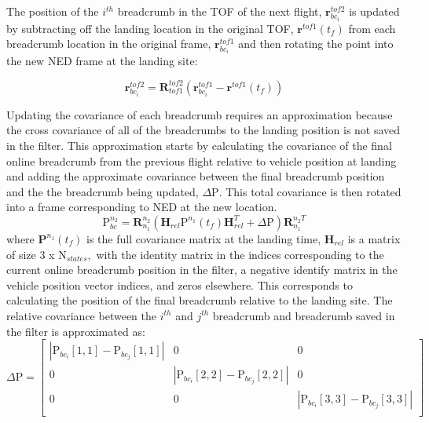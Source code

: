 The position of the $i^{th}$ breadcrumb in the TOF of the next flight, $\bm{r}_{bc_i}^{tof2}$ is updated by subtracting off the landing location in the original TOF, $\bm{r}^{tof1}(t_f)$ from each breadcrumb location in the original frame, $\bm{r}_{bc_i}^{tof1}$ and then rotating the point into the new NED frame at the landing site:

\begin{equation}
    \bm{r}_{bc_i}^{tof2} = \bm{R}_{tof1}^{tof2} \left( \bm{r}_{bc_i}^{tof1} - \bm{r}^{tof1}(t_f) \right)
\end{equation}

Updating the covariance of each breadcrumb requires an approximation because the cross covariance of all of the breadcrumbs to the landing position is not saved in the filter.  This approximation starts by calculating the covariance of the final online breadcrumb from the previous flight relative to vehicle position at landing and adding the approximate covariance between the final breadcrumb position and the the breadcrumb being updated, $\Delta \text{P}$.  This total covariance is then rotated into a frame corresponding to NED at the new location.  
\begin{equation}
    \text{P}_{bc}^{n_2} = \bm{R}_{n_1}^{n_2}\left(\bm{H}_{rel} \text{P}^{n_1}(t_f) \bm{H}_{rel}^T + \Delta \text{P}\right) \bm{R}_{n_1}^{n_2 T}
\end{equation}
\noindent where $\bm{P}^{n_1}(t_f)$ is the full covariance matrix at the landing time, $\bm{H}_{rel}$ is a matrix of size 3 x $\text{N}_{states},$ with the identity matrix in the indices corresponding to the current online breadcrumb position in the filter, a negative identify matrix in the vehicle position vector indices, and zeros elsewhere.  This corresponds to calculating the position of the final breadcrumb relative to the landing site.  The relative covariance between the $i^{th}$ and $j^{th}$ breadcrumb and breadcrumb saved in the filter is approximated as:
\begin{equation}
    \Delta \text{P} = \left[ {\begin{array}{ccc}
   |\text{P}_{bc_i}[1,1] - \text{P}_{bc_j}[1,1]| & 0 & 0 \\
   0 & |\text{P}_{bc_i}[2,2] - \text{P}_{bc_j}[2,2]| & 0 \\
   0 & 0 & |\text{P}_{bc_i}[3,3] - \text{P}_{bc_j}[3,3]|\\
  \end{array} } \right]
  \label{eq:DeltaP}
\end{equation}
